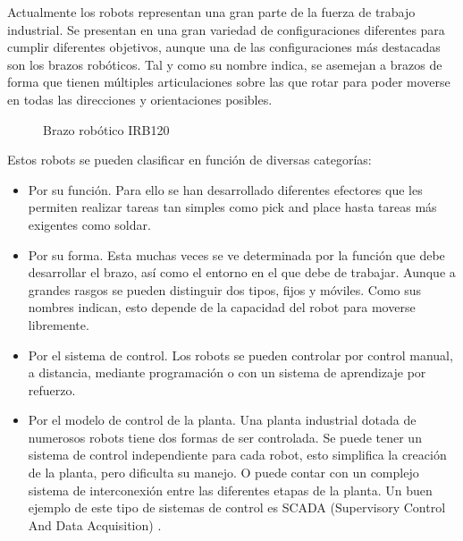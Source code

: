 Actualmente los robots representan una gran parte de la fuerza de trabajo industrial. Se presentan en una gran variedad de configuraciones diferentes para cumplir diferentes objetivos, aunque una de las configuraciones más destacadas son los brazos robóticos. Tal y como su nombre indica, se asemejan a brazos de forma que tienen múltiples articulaciones sobre las que rotar para poder moverse en todas las direcciones y orientaciones posibles. 

\begin{figure}[ht]
  \hfill	
\caption{Brazo robótico IRB120}
\label{fig:IRB}
\end{figure}
\vspace{30pt}
Estos robots se pueden clasificar en función de diversas categorías:
	
\begin{itemize}
\item Por su función. Para ello se han desarrollado diferentes efectores que les permiten realizar tareas tan simples como pick and place hasta tareas más exigentes como soldar.
		
\item Por su forma. Esta muchas veces se ve determinada por la función que debe desarrollar el brazo, así como el entorno en el que debe de trabajar. Aunque a grandes rasgos se pueden distinguir dos tipos, fijos y móviles. Como sus nombres indican, esto depende de la capacidad del robot para moverse libremente.
		
\item Por el sistema de control. Los robots se pueden controlar por control manual, a distancia, mediante programación o con un sistema de aprendizaje por refuerzo.
		
\item Por el modelo de control de la planta. Una planta industrial dotada de numerosos robots tiene dos formas de ser controlada. Se puede tener un sistema de control independiente para cada robot, esto simplifica la creación de la planta, pero dificulta su manejo. O puede contar con un complejo sistema de interconexión entre las diferentes etapas de la planta. Un buen ejemplo de este tipo de sistemas de control es SCADA (Supervisory Control And Data Acquisition) \cite{SCADA}.
\end{itemize}

